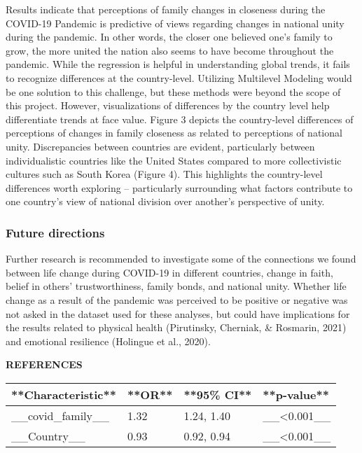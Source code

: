 \documentclass[
  english,
  man]{apa6}
\begin{document}
Results indicate that perceptions of family changes in closeness during the COVID-19 Pandemic is predictive of views regarding changes in national unity during the pandemic. In other words, the closer one believed one's family to grow, the more united the nation also seems to have become throughout the pandemic. While the regression is helpful in understanding global trends, it fails to recognize differences at the country-level. Utilizing Multilevel Modeling would be one solution to this challenge, but these methods were beyond the scope of this project. However, visualizations of differences by the country level help differentiate trends at face value. Figure 3 depicts the country-level differences of perceptions of changes in family closeness as related to perceptions of national unity. Discrepancies between countries are evident, particularly between individualistic countries like the United States compared to more collectivistic cultures such as South Korea (Figure 4). This highlights the country-level differences worth exploring -- particularly surrounding what factors contribute to one country's view of national division over another's perspective of unity.

\hypertarget{future-directions}{%
\subsubsection{Future directions}\label{future-directions}}

Further research is recommended to investigate some of the connections we found between life change during COVID-19 in different countries, change in faith, belief in others' trustworthiness, family bonds, and national unity. Whether life change as a result of the pandemic was perceived to be positive or negative was not asked in the dataset used for these analyses, but could have implications for the results related to physical health (Pirutinsky, Cherniak, \& Rosmarin, 2021) and emotional resilience (Holingue et al., 2020).

\newpage

\textbf{REFERENCES}

\begin{tabular}{l|l|l|l}
\hline
**Characteristic** & **OR** & **95\% CI** & **p-value**\\
\hline
\_\_covid\_family\_\_ & 1.32 & 1.24, 1.40 & \_\_<0.001\_\_\\
\hline
\_\_Country\_\_ & 0.93 & 0.92, 0.94 & \_\_<0.001\_\_\\
\hline
\end{tabular}
\end{document}
